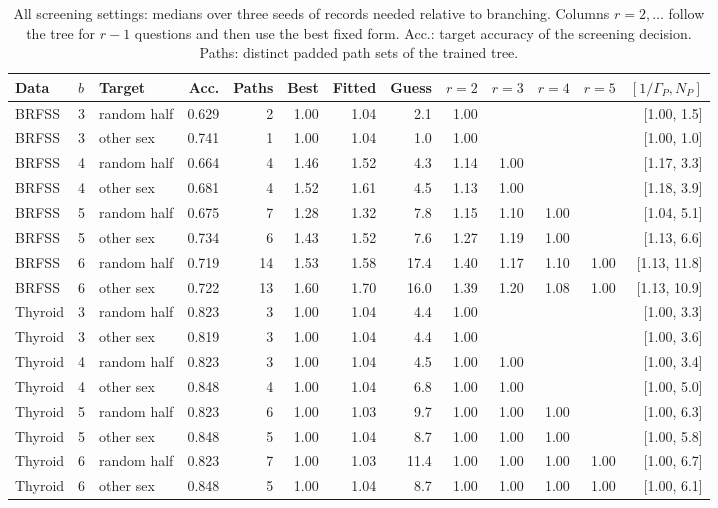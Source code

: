 \begin{table}[h]
\centering
\caption{All screening settings: medians over three seeds of records needed relative to branching. Columns $r=2,\ldots$ follow the tree for $r-1$ questions and then use the best fixed form. Acc.: target accuracy of the screening decision. Paths: distinct padded path sets of the trained tree.}
\label{tab:screeningdetail}
\small
\begin{tabular}{lllrrrrrrrrrr}
\toprule
Data & $b$ & Target & Acc. & Paths & Best & Fitted & Guess & $r=2$ & $r=3$ & $r=4$ & $r=5$ & $[1/\Gamma_P,N_P]$ \\
\midrule
BRFSS & 3 & random half & 0.629 & 2 & 1.00 & 1.04 & 2.1 & 1.00 &  &  &  & [1.00, 1.5] \\
BRFSS & 3 & other sex & 0.741 & 1 & 1.00 & 1.04 & 1.0 & 1.00 &  &  &  & [1.00, 1.0] \\
BRFSS & 4 & random half & 0.664 & 4 & 1.46 & 1.52 & 4.3 & 1.14 & 1.00 &  &  & [1.17, 3.3] \\
BRFSS & 4 & other sex & 0.681 & 4 & 1.52 & 1.61 & 4.5 & 1.13 & 1.00 &  &  & [1.18, 3.9] \\
BRFSS & 5 & random half & 0.675 & 7 & 1.28 & 1.32 & 7.8 & 1.15 & 1.10 & 1.00 &  & [1.04, 5.1] \\
BRFSS & 5 & other sex & 0.734 & 6 & 1.43 & 1.52 & 7.6 & 1.27 & 1.19 & 1.00 &  & [1.13, 6.6] \\
BRFSS & 6 & random half & 0.719 & 14 & 1.53 & 1.58 & 17.4 & 1.40 & 1.17 & 1.10 & 1.00 & [1.13, 11.8] \\
BRFSS & 6 & other sex & 0.722 & 13 & 1.60 & 1.70 & 16.0 & 1.39 & 1.20 & 1.08 & 1.00 & [1.13, 10.9] \\
Thyroid & 3 & random half & 0.823 & 3 & 1.00 & 1.04 & 4.4 & 1.00 &  &  &  & [1.00, 3.3] \\
Thyroid & 3 & other sex & 0.819 & 3 & 1.00 & 1.04 & 4.4 & 1.00 &  &  &  & [1.00, 3.6] \\
Thyroid & 4 & random half & 0.823 & 3 & 1.00 & 1.04 & 4.5 & 1.00 & 1.00 &  &  & [1.00, 3.4] \\
Thyroid & 4 & other sex & 0.848 & 4 & 1.00 & 1.04 & 6.8 & 1.00 & 1.00 &  &  & [1.00, 5.0] \\
Thyroid & 5 & random half & 0.823 & 6 & 1.00 & 1.03 & 9.7 & 1.00 & 1.00 & 1.00 &  & [1.00, 6.3] \\
Thyroid & 5 & other sex & 0.848 & 5 & 1.00 & 1.04 & 8.7 & 1.00 & 1.00 & 1.00 &  & [1.00, 5.8] \\
Thyroid & 6 & random half & 0.823 & 7 & 1.00 & 1.03 & 11.4 & 1.00 & 1.00 & 1.00 & 1.00 & [1.00, 6.7] \\
Thyroid & 6 & other sex & 0.848 & 5 & 1.00 & 1.04 & 8.7 & 1.00 & 1.00 & 1.00 & 1.00 & [1.00, 6.1] \\
\bottomrule
\end{tabular}
\end{table}
